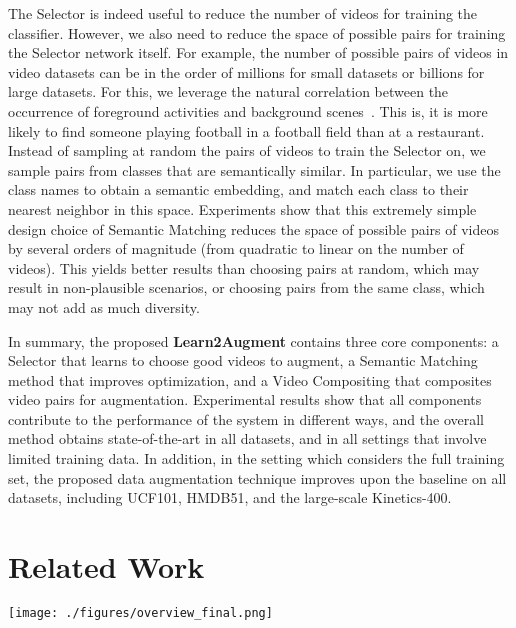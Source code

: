\documentclass[runningheads]{llncs}
\newcommand{\Method}{Learn2Augment\xspace}
\newcommand{\SemanticMatch}{Semantic Matching\xspace}
\newcommand{\VideoMix}{Video Compositing\xspace}
\begin{document}
The Selector is indeed useful to reduce the number of videos for training the classifier. However, we also need to reduce the space of possible pairs for training the Selector network itself. For example, the number of possible pairs of videos in video datasets can be in the order of millions for small datasets or billions for large datasets.
For this, we leverage the natural correlation between the occurrence of foreground activities and background scenes~\cite{Choi-NeurIPS-2019}. This is, it is more likely to find someone playing football in a football field than at a restaurant. Instead of sampling at random the pairs of videos to train the Selector on, we sample pairs from classes that are semantically similar. In particular, we use the class names to obtain a semantic embedding, and match each class to their nearest neighbor in this space. Experiments show that this extremely simple design choice of Semantic Matching reduces the space of possible pairs of videos by several orders of magnitude (from quadratic to linear on the number of videos). This yields better results than choosing pairs at random, which may result in non-plausible scenarios, or choosing pairs from the same class, which may not add as much diversity. 











In summary, the proposed \textbf{\Method} contains three core components: a Selector that learns to choose good videos to augment, a \SemanticMatch method that improves optimization, and a \VideoMix that composites video pairs for augmentation. Experimental results show that all components contribute to the performance of the system in different ways, and the overall method obtains state-of-the-art in all datasets, and in all settings that involve limited training data. In addition, in the setting which considers the full training set, the proposed data augmentation technique improves upon the baseline on all datasets, including UCF101, HMDB51, and the large-scale Kinetics-400. 





\section{Related Work}


\begin{figure*}[h!]
    \centering
    \texttt{[image: ./figures/overview\_final.png]}
\caption{Overview of the proposed \Method. Given a pair of videos and their labels, a Selector network gives a score  of the quality of the potential composited video. At training time, the Selector is trained with the validation loss of the classification network. Once the Selector is trained, pairs of videos are sampled, and only the promising combinations with high score  are composited and used for training the classifier. }
    \label{fig:overview}
\end{figure*}
\end{document}
